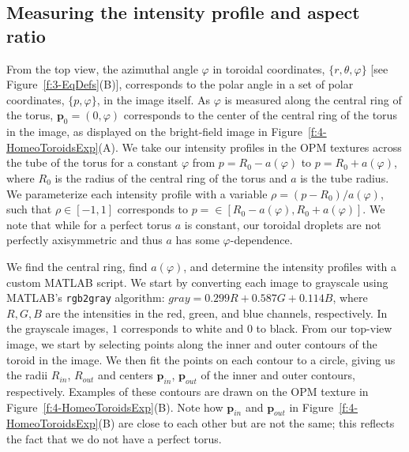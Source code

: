 \subsection{Measuring the intensity profile and aspect ratio}
From the top view, the azimuthal angle $\varphi$ in toroidal coordinates, $\{r,\theta,\varphi \}$ [see Figure~\ref{f:3-EqDefs}(B)], corresponds to the polar angle in a set of polar coordinates, $\{p,\varphi \}$, in the image itself.
As $\varphi$ is measured along the central ring of the torus, $\mathbf{p}_0 = (0,\varphi)$ corresponds to the center of the central ring of the torus in the image, as displayed on the bright-field image in Figure~\ref{f:4-HomeoToroidsExp}(A).
We take our intensity profiles in the OPM textures across the tube of the torus for a constant $\varphi$ from $p = R_0 - a(\varphi)$ to $p = R_0+ a(\varphi)$, where $R_0$ is the radius of the central ring of the torus and $a$ is the tube radius.
We parameterize each intensity profile with a variable $\rho = (p - R_0)/a(\varphi)$, such that $\rho \in [-1,1]$ corresponds to $p = \in [R_0 - a(\varphi),R_0 + a(\varphi)]$.
We note that while for a perfect torus $a$ is constant, our toroidal droplets are not perfectly axisymmetric and thus $a$ has some $\varphi$-dependence.

We find the central ring, find $a(\varphi)$, and determine the intensity profiles with a custom MATLAB script.
We start by converting each image to grayscale using MATLAB's \texttt{rgb2gray} algorithm: $\mathit{gray} = 0.299 R + 0.587 G + 0.114 B$, where $R,G,B$ are the intensities in the red, green, and blue channels, respectively.
In the grayscale images, $1$ corresponds to white and $0$ to black.
From our top-view image, we start by selecting points along the inner and outer contours of the toroid in the image.
We then fit the points on each contour to a circle, giving us the radii $R_{in}$, $R_{out}$ and centers $\mathbf{p}_{in}$, $\mathbf{p}_{out}$ of the inner and outer contours, respectively.
Examples of these contours are drawn on the OPM texture in Figure~\ref{f:4-HomeoToroidsExp}(B).
Note how $\mathbf{p}_{in}$ and $\mathbf{p}_{out}$ in Figure~\ref{f:4-HomeoToroidsExp}(B) are close to each other but are not the same; this reflects the fact that we do not have a perfect torus.

